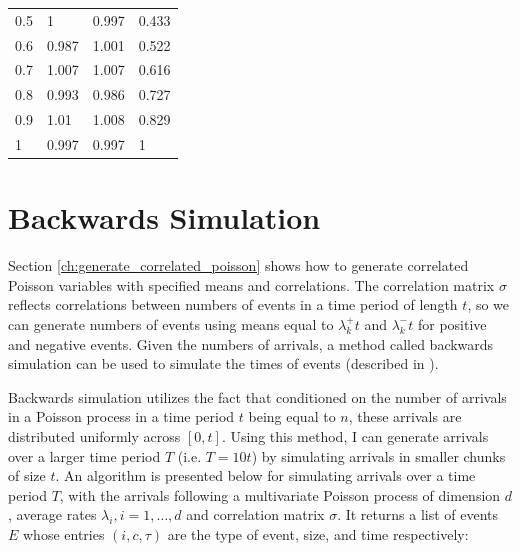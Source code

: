 \begin{table}
\begin{tabular}{l|l|l|l}
0.5                 & 1                               & 0.997                           & 0.433               \\
0.6                 & 0.987                           & 1.001                           & 0.522               \\
0.7                 & 1.007                           & 1.007                           & 0.616               \\
0.8                 & 0.993                           & 0.986                           & 0.727               \\
0.9                 & 1.01                            & 1.008                           & 0.829               \\
1                   & 0.997                           & 0.997                           & 1                  
\end{tabular}
\end{table}

\section{Backwards Simulation} \label{ch:backwards_simulation}

Section \ref{ch:generate_correlated_poisson} shows how to generate correlated Poisson variables with specified means and correlations. The correlation matrix $\sigma$ reflects correlations between numbers of events in a time period of length $t$, so we can generate numbers of events using means equal to $\lambda^+_k t$ and $\lambda^-_k t$ for positive and negative events. Given the numbers of arrivals, a method called backwards simulation can be used to simulate the times of events (described in \cite{A7}). 

Backwards simulation utilizes the fact that conditioned on the number of arrivals in a Poisson process in a time period $t$ being equal to $n$, these arrivals are distributed uniformly across $[0,t]$. Using this method, I can generate arrivals over a larger time period $T$ (i.e. $T = 10t$) by simulating arrivals in smaller chunks of size $t$. An algorithm is presented below for simulating arrivals over a time period $T$, with the arrivals following a multivariate Poisson process of dimension $d$, average rates $\lambda_i, i = 1, \ldots, d$ and correlation matrix $\sigma$. It returns a list of events $E$ whose entries $(i,c,\tau)$ are the type of event, size, and time respectively:

